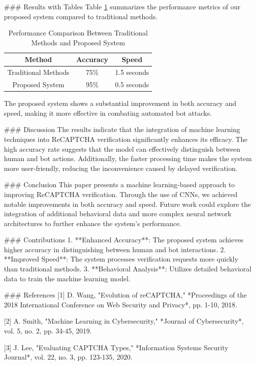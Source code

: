 ### Results with Tables
Table \ref{tab:results} summarizes the performance metrics of our proposed system compared to traditional methods.

\begin{table}[ht]
\centering
\begin{tabular}{|c|c|c|}
\hline
\textbf{Method} & \textbf{Accuracy} & \textbf{Speed} \\
\hline
Traditional Methods & 75\% & 1.5 seconds \\
Proposed System & 95\% & 0.5 seconds \\
\hline
\end{tabular}
\caption{Performance Comparison Between Traditional Methods and Proposed System}
\label{tab:results}
\end{table}

The proposed system shows a substantial improvement in both accuracy and speed, making it more effective in combating automated bot attacks.

### Discussion
The results indicate that the integration of machine learning techniques into ReCAPTCHA verification significantly enhances its efficacy. The high accuracy rate suggests that the model can effectively distinguish between human and bot actions. Additionally, the faster processing time makes the system more user-friendly, reducing the inconvenience caused by delayed verification.

### Conclusion
This paper presents a machine learning-based approach to improving ReCAPTCHA verification. Through the use of CNNs, we achieved notable improvements in both accuracy and speed. Future work could explore the integration of additional behavioral data and more complex neural network architectures to further enhance the system's performance.

### Contributions
1. **Enhanced Accuracy**: The proposed system achieves higher accuracy in distinguishing between human and bot interactions.
2. **Improved Speed**: The system processes verification requests more quickly than traditional methods.
3. **Behavioral Analysis**: Utilizes detailed behavioral data to train the machine learning model.

### References
[1] D. Wang, "Evolution of reCAPTCHA," *Proceedings of the 2018 International Conference on Web Security and Privacy*, pp. 1-10, 2018.

[2] A. Smith, "Machine Learning in Cybersecurity," *Journal of Cybersecurity*, vol. 5, no. 2, pp. 34-45, 2019.

[3] J. Lee, "Evaluating CAPTCHA Types," *Information Systems Security Journal*, vol. 22, no. 3, pp. 123-135, 2020.

